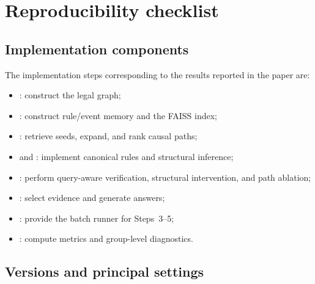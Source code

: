 \section{Reproducibility checklist}
\label{app:reproducibility}

\subsection{Implementation components}

The implementation steps corresponding to the results reported in the paper
are:

\begin{itemize}
    \item {}: construct the legal graph;
    \item {}: construct rule/event memory and
    the FAISS index;
    \item {}: retrieve seeds, expand, and
    rank causal paths;
    \item {} and
    : implement canonical rules and structural
    inference;
    \item {}: perform query-aware
    verification, structural intervention, and path ablation;
    \item {}: select evidence and generate
    answers;
    \item {}: provide the batch
    runner for Steps~3--5;
    \item {}: compute metrics and
    group-level diagnostics.
\end{itemize}

\subsection{Versions and principal settings}

